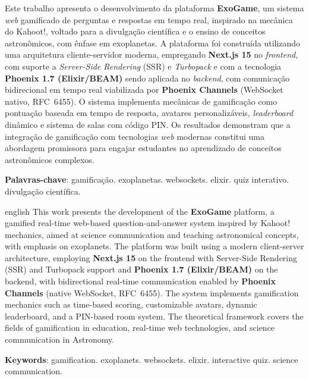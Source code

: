 \documentclass[
	12pt,
	openany,
	oneside,
	a4paper,
	english,
	brazil
]{abntex2}
\begin{document}
\setlength{\absparsep}{18pt}
\begin{resumo}
Este trabalho apresenta o desenvolvimento da plataforma \textbf{ExoGame}, um sistema \textit{web} gamificado de perguntas e respostas em tempo real, inspirado na mecânica do Kahoot!, voltado para a divulgação científica e o ensino de conceitos astronômicos, com ênfase em exoplanetas. A plataforma foi construída utilizando uma arquitetura cliente-servidor moderna, empregando \textbf{Next.js 15} no \textit{frontend}, com suporte a \textit{Server-Side Rendering} (SSR) e \textit{Turbopack} e com a tecnologia \textbf{Phoenix 1.7 (Elixir/BEAM)} sendo aplicada no \textit{backend}, com comunicação bidirecional em tempo real viabilizada por \textbf{Phoenix Channels} (WebSocket nativo, RFC~6455). O sistema implementa mecânicas de gamificação como pontuação baseada em tempo de resposta, avatares personalizáveis, \textit{leaderboard} dinâmico e sistema de salas com código PIN. Os resultados demonstram que a integração de gamificação com tecnologias \textit{web} modernas constitui uma abordagem promissora para engajar estudantes no aprendizado de conceitos astronômicos complexos.

\textbf{Palavras-chave}: gamificação. exoplanetas. websockets. elixir. quiz interativo. divulgação científica.
\end{resumo}

\begin{resumo}[Abstract]
\begin{otherlanguage*}{english}
This work presents the development of the \textbf{ExoGame} platform, a gamified real-time web-based question-and-answer system inspired by Kahoot! mechanics, aimed at science communication and teaching astronomical concepts, with emphasis on exoplanets. The platform was built using a modern client-server architecture, employing \textbf{Next.js 15} on the frontend with Server-Side Rendering (SSR) and Turbopack support and \textbf{Phoenix 1.7 (Elixir/BEAM)} on the backend, with bidirectional real-time communication enabled by \textbf{Phoenix Channels} (native WebSocket, RFC~6455). The system implements gamification mechanics such as time-based scoring, customizable avatars, dynamic leaderboard, and a PIN-based room system. The theoretical framework covers the fields of gamification in education, real-time web technologies, and science communication in Astronomy.

\vspace{\onelineskip}
\noindent
\textbf{Keywords}: gamification. exoplanets. websockets. elixir. interactive quiz. science communication.
\end{otherlanguage*}
\end{resumo}
\end{document}
